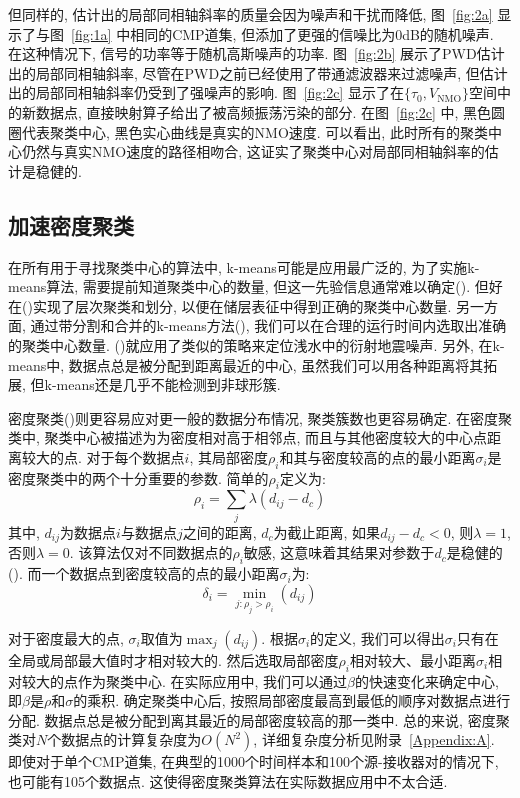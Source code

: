 但同样的, 估计出的局部同相轴斜率的质量会因为噪声和干扰而降低, 图~\ref{fig:2a} 显示了与图~\ref{fig:1a} 中相同的CMP道集, 但添加了更强的信噪比为0dB的随机噪声. 在这种情况下, 信号的功率等于随机高斯噪声的功率. 图~\ref{fig:2b} 展示了PWD估计出的局部同相轴斜率, 尽管在PWD之前已经使用了带通滤波器来过滤噪声, 但估计出的局部同相轴斜率仍受到了强噪声的影响. 图~\ref{fig:2c} 显示了在$\{\tau_0,V_{\mathrm{NMO}}\}$空间中的新数据点, 直接映射算子给出了被高频振荡污染的部分. 在图~\ref{fig:2c} 中, 黑色圆圈代表聚类中心, 黑色实心曲线是真实的NMO速度. 可以看出, 此时所有的聚类中心仍然与真实NMO速度的路径相吻合, 这证实了聚类中心对局部同相轴斜率的估计是稳健的. 
\subsection{加速密度聚类}
在所有用于寻找聚类中心的算法中, k-means可能是应用最广泛的, 为了实施k-means算法, 需要提前知道聚类中心的数量, 但这一先验信息通常难以确定(\cite{Hamerly2004}). 但好在\citeauthor{Wang2012}(\citeyear{Wang2012})实现了层次聚类和划分, 以便在储层表征中得到正确的聚类中心数量. 另一方面, 通过带分割和合并的k-means方法(\cite{Muhr2009}), 我们可以在合理的运行时间内选取出准确的聚类中心数量. \citeauthor{Lu2014}(\citeyear{Lu2014})就应用了类似的策略来定位浅水中的衍射地震噪声. 另外, 在k-means中, 数据点总是被分配到距离最近的中心, 虽然我们可以用各种距离将其拓展, 但k-means还是几乎不能检测到非球形簇. 

密度聚类(\cite{Rodriguez2014})则更容易应对更一般的数据分布情况, 聚类簇数也更容易确定. 在密度聚类中, 聚类中心被描述为为密度相对高于相邻点, 而且与其他密度较大的中心点距离较大的点. 对于每个数据点$i$, 其局部密度$\rho_i$和其与密度较高的点的最小距离$\sigma_i$是密度聚类中的两个十分重要的参数. 简单的$\rho_i$定义为:
\begin{equation}
    \rho_{i}=\sum_{j} \lambda\left(d_{i j}-d_{c}\right)
\end{equation}
其中, $d_{ij}$为数据点$i$与数据点$j$之间的距离, $d_c$为截止距离, 如果$d_{ij}-d_c<0$, 则$λ = 1$, 否则$λ = 0$. 该算法仅对不同数据点的$\rho_i$敏感, 这意味着其结果对参数于$d_c$是稳健的(\cite{Rodriguez2014}). 而一个数据点到密度较高的点的最小距离$\sigma_i$为: 
\begin{equation}
    \delta_{i}=\min _{j: \rho_{j}>\rho_{i}}\left(d_{i j}\right)
\end{equation}

对于密度最大的点, $\sigma_i$取值为$\max_j(d_{ij})$. 根据$\sigma_i$的定义, 我们可以得出$\sigma_i$只有在全局或局部最大值时才相对较大的. 然后选取局部密度$\rho_i$相对较大、最小距离$\sigma_i$相对较大的点作为聚类中心. 在实际应用中, 我们可以通过$\beta$的快速变化来确定中心, 即$\beta$是$\rho$和$\sigma$的乘积. 确定聚类中心后, 按照局部密度最高到最低的顺序对数据点进行分配. 数据点总是被分配到离其最近的局部密度较高的那一类中. 总的来说, 密度聚类对$N$个数据点的计算复杂度为$O(N^2)$, 详细复杂度分析见附录~\ref{Appendix:A}. 即使对于单个CMP道集, 在典型的1000个时间样本和100个源-接收器对的情况下, 也可能有105个数据点. 这使得密度聚类算法在实际数据应用中不太合适. 

